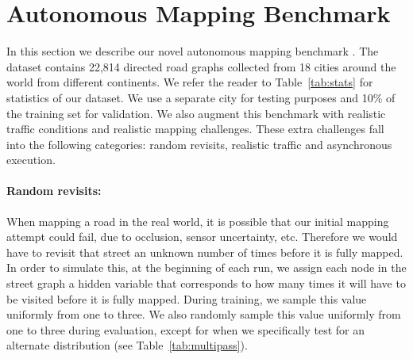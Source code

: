 \section{Autonomous Mapping Benchmark}
In this section we describe our novel autonomous mapping benchmark
. The dataset contains
22,814 directed road graphs collected from 18 cities around the world from different continents.
We refer the reader to Table~\ref{tab:stats} for  statistics of our dataset. We use a separate city for testing
purposes and 10\% of the training set for validation. We also augment this benchmark with realistic
traffic conditions and realistic mapping challenges. These extra challenges fall into the following
categories: random revisits, realistic traffic and asynchronous execution.

\vspace{-0.1in}
\paragraph{Random revisits:}
When mapping a road in the real world, it is possible that our initial mapping attempt
could fail, due to occlusion, sensor uncertainty, etc. Therefore we would have to revisit that
street an unknown number of times before it is fully mapped. In order to simulate this,
at the beginning of each run, we assign each node in the street graph a hidden variable
that corresponds to how many times it will have to be visited before it is fully mapped.
During training, we sample this value uniformly from one to three. We also randomly sample
this value uniformly from one to three during evaluation, except for when we specifically
test for an alternate distribution (see Table~\ref{tab:multipass}).

\vspace{-0.1in}
